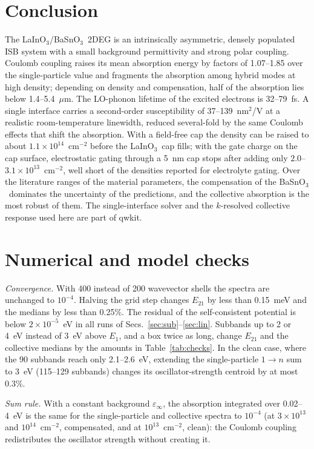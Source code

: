 \documentclass[11pt]{article}
\newcommand{\LIO}{\texorpdfstring{LaInO$_3$}{LaInO3}}
\newcommand{\BSO}{\texorpdfstring{BaSnO$_3$}{BaSnO3}}
\begin{document}
\section{Conclusion}
The \LIO/\BSO\ 2DEG is an intrinsically asymmetric, densely populated ISB system with a small background permittivity and strong polar coupling. Coulomb coupling raises its mean absorption energy by factors of 1.07--1.85 over the single-particle value and fragments the absorption among hybrid modes at high density; depending on density and compensation, half of the absorption lies below 1.4--5.4~$\mu$m. The LO-phonon lifetime of the excited electrons is 32--79~fs. A single interface carries a second-order susceptibility of 37--139~nm$^2$/V at a realistic room-temperature linewidth, reduced several-fold by the same Coulomb effects that shift the absorption. With a field-free cap the density can be raised to about $1.1\times10^{14}$~cm$^{-2}$ before the \LIO\ cap fills; with the gate charge on the cap surface, electrostatic gating through a 5~nm cap stops after adding only $2.0$--$3.1\times10^{13}$~cm$^{-2}$, well short of the densities reported for electrolyte gating. Over the literature ranges of the material parameters, the compensation of the \BSO\ dominates the uncertainty of the predictions, and the collective absorption is the most robust of them. The single-interface solver and the $k$-resolved collective response used here are part of qwkit.

\appendix
\section{Numerical and model checks}\label{app:checks}
\emph{Convergence.} With 400 instead of 200 wavevector shells the spectra are unchanged to $10^{-4}$. Halving the grid step changes $E_{21}$ by less than 0.15~meV and the medians by less than 0.25\%. The residual of the self-consistent potential is below $2\times10^{-5}$~eV in all runs of Secs.~\ref{sec:sub}--\ref{sec:lin}. Subbands up to 2 or 4~eV instead of 3~eV above $E_1$, and a box twice as long, change $E_{21}$ and the collective medians by the amounts in Table~\ref{tab:checks}. In the clean case, where the 90 subbands reach only 2.1--2.6~eV, extending the single-particle $1\to n$ sum to 3~eV (115--129 subbands) changes its oscillator-strength centroid by at most 0.3\%.

\emph{Sum rule.} With a constant background $\varepsilon_\infty$, the absorption integrated over 0.02--4~eV is the same for the single-particle and collective spectra to $10^{-4}$ (at $3\times10^{13}$ and $10^{14}$~cm$^{-2}$, compensated, and at $10^{13}$~cm$^{-2}$, clean): the Coulomb coupling redistributes the oscillator strength without creating it.
\end{document}
